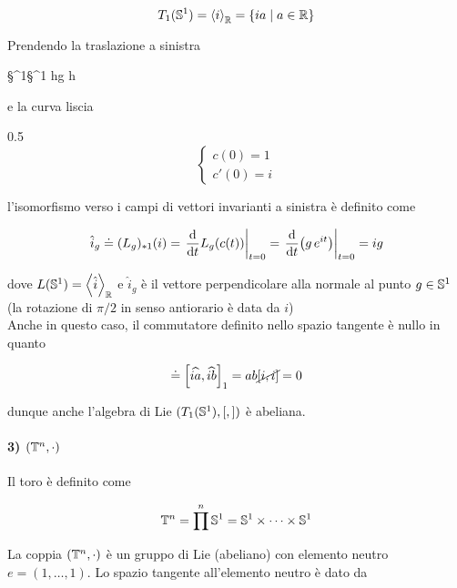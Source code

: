 \begin{equation}
	T_{1}(\S^{1}) = \ev{i}_{\R} = \{ ia \mid a \in \R \}
\end{equation}

Prendendo la traslazione a sinistra

	{\S^{1}}{\S^{1}}
	{h}{g h}
	
e la curva liscia

	{0.5}{%
			\begin{equation}
				\begin{cases}
					c(0) = 1 \\
					c'(0) = i
				\end{cases}
			\end{equation}
			}

l'isomorfismo verso i campi di vettori invarianti a sinistra è definito come

\begin{equation}
	\hat{i}_{g} \doteq (L_{g})_{*1} (i) %
	= \eval{ \dv{t} L_{g}(c(t)) }_{t=0} %
	= \eval{ \dv{t} (g \, e^{i t}) }_{t=0} %
	= i g
\end{equation}

dove $ L(\S^{1}) = \ev{\hat{i}}_{\R} $ e $ \hat{i}_{g} $ è il vettore perpendicolare alla normale al punto $ g \in \S^{1} $ (la rotazione di $ \pi/2 $ in senso antiorario è data da $ i $)\\
Anche in questo caso, il commutatore definito nello spazio tangente è nullo in quanto

\begin{equation}
	[ia,ib] \doteq \comm{\widehat{ia}}{\widehat{ib}}_{1} %
	= a b \cancel{ [i,i] } %
	= 0
\end{equation}

dunque anche l'algebra di Lie $ (T_{1}(\S^{1}),[,]) $ è abeliana.

\paragraph{3) $ (\T^{n},\cdot) $}

Il toro è definito come

\begin{equation}
	\T^{n} = \prod^{n} \S^{1} = \S^{1} \times \cdots \times \S^{1}
\end{equation}

La coppia $ (\T^{n},\cdot) $ è un gruppo di Lie (abeliano) con elemento neutro $ e = (1,\dots,1) $. Lo spazio tangente all'elemento neutro è dato da

